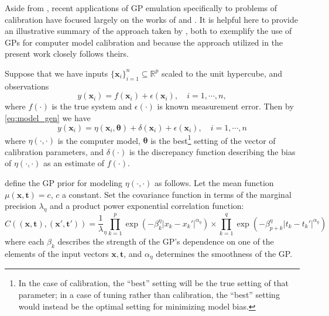 \documentclass{article}
\begin{document}

Aside from \cite{Kennedy2001}, recent applications of GP emulation specifically to problems of calibration have focused largely on the works of \cite{Williams2006} and \cite{Bayarri2007}. It is helpful here to provide an illustrative summary of the approach taken by \cite{Williams2006}, both to exemplify the use of GPs for computer model calibration and because the approach utilized in the present work closely follows theirs.

Suppose that we have inputs $\{\mathbf x_i\}_{i=1}^n\subseteq \mathbb R^p$ scaled to the unit hypercube, and observations 
\begin{equation}\label{eq:2}
y(\mathbf x_i) = f(\mathbf x_i) + \epsilon(\mathbf x_i),\quad i=1,\cdots,n,
\end{equation}
where $f(\cdot)$ is the true system and $\epsilon(\cdot)$ is known measurement error. Then by \eqref{eq:model_gen} we have
\begin{equation}\label{eq:2}
y(\mathbf x_i) = \eta(\mathbf x_i,\boldsymbol \theta) + \delta(\mathbf x_i) + \epsilon(\mathbf x_i),\quad i=1,\cdots,n
\end{equation}
where $\eta(\cdot,\cdot)$ is the computer model, $\boldsymbol \theta$ is the best\footnote{In the case of calibration, the ``best'' setting will be the true setting of that parameter; in a case of tuning rather than calibration, the ``best'' setting would instead be the optimal setting for minimizing model bias.}
setting of the vector of calibration parameters, and $\delta(\cdot)$ is the discrepancy function describing the bias of $\eta(\cdot,\cdot)$ as an estimate of $f(\cdot)$.

\citeauthor*{Williams2006} define the GP prior for modeling $\eta(\cdot,\cdot)$ as follows. Let the mean function $\mu(\mathbf x,\mathbf t)=c$, $c$ a constant. Set the covariance function in terms of the marginal precision $\lambda_\eta$ and a product power exponential correlation function:
\begin{equation}\label{eq:Hig_cov}
C((\mathbf x,\mathbf t),(\mathbf x',\mathbf t')) = \frac 1\lambda_\eta \prod_{k=1}^{p}
\exp \left(-\beta^\eta_k|x_k-x_k'|^{\alpha_\eta}\right) \times
\prod_{k=1}^{q}
\exp \left(-\beta^\eta_{p+k}|t_k-t_k'|^{\alpha_\eta}\right)
\end{equation}
where each $\beta_k$ describes the strength of the GP's dependence on one of the elements of the input vectors $\mathbf x,\mathbf t$, and $\alpha_\eta$ determines the smoothness of the GP. 
\end{document}
